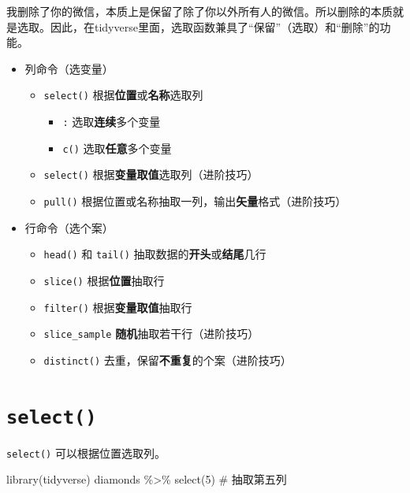 \documentclass[
  letterpaper,
]{ctexbook}
\newenvironment{Shaded}{\begin{snugshade}}{\end{snugshade}}
\newcommand{\CommentTok}[1]{\textcolor[rgb]{0.37,0.37,0.37}{#1}}
\newcommand{\DecValTok}[1]{\textcolor[rgb]{0.68,0.00,0.00}{#1}}
\newcommand{\FunctionTok}[1]{\textcolor[rgb]{0.28,0.35,0.67}{#1}}
\newcommand{\NormalTok}[1]{\textcolor[rgb]{0.00,0.23,0.31}{#1}}
\newcommand{\SpecialCharTok}[1]{\textcolor[rgb]{0.37,0.37,0.37}{#1}}
\providecommand{\tightlist}{%
  \setlength{\itemsep}{0pt}\setlength{\parskip}{0pt}}\usepackage{longtable,booktabs,array}
\begin{document}
我删除了你的微信，本质上是保留了除了你以外所有人的微信。所以删除的本质就是选取。因此，在tidyverse里面，选取函数兼具了``保留''（选取）和``删除''的功能。

\begin{itemize}
\tightlist
\item
  列命令（选变量）

  \begin{itemize}
  \tightlist
  \item
    \texttt{select()} 根据{\textbf{位置}}或{\textbf{名称}}选取列

    \begin{itemize}
    \tightlist
    \item
      \texttt{:} 选取{\textbf{连续}}多个变量
    \item
      \texttt{c()} 选取{\textbf{任意}}多个变量
    \end{itemize}
  \item
    \texttt{select()} 根据{\textbf{变量取值}}选取列{（进阶技巧）}
  \item
    \texttt{pull()}
    根据位置或名称抽取一列，输出{\textbf{矢量}}格式{（进阶技巧）}
  \end{itemize}
\item
  行命令（选个案）

  \begin{itemize}
  \tightlist
  \item
    \texttt{head()} 和 \texttt{tail()}
    抽取数据的{\textbf{开头}}或{\textbf{结尾}}几行
  \item
    \texttt{slice()} 根据{\textbf{位置}}抽取行
  \item
    \texttt{filter()} 根据{\textbf{变量取值}}抽取行
  \item
    \texttt{slice\_sample} {\textbf{随机}}抽取若干行{（进阶技巧）}
  \item
    \texttt{distinct()} 去重，保留{\textbf{不重复}}的个案{（进阶技巧）}
  \end{itemize}
\end{itemize}

\hypertarget{select}{%
\section{\texorpdfstring{\texttt{select()}}{select()}}\label{select}}

\texttt{select()} 可以根据位置选取列。

\begin{Shaded}
\begin{Highlighting}[]
\FunctionTok{library}\NormalTok{(tidyverse)}
\NormalTok{diamonds }\SpecialCharTok{\%\textgreater{}\%}
  \FunctionTok{select}\NormalTok{(}\DecValTok{5}\NormalTok{) }\CommentTok{\# 抽取第五列}
\end{Highlighting}
\end{Shaded}
\end{document}
